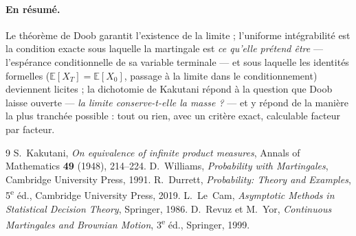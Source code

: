 \documentclass[11pt,a4paper]{article}
\theoremstyle{plain}
\theoremstyle{definition}
\theoremstyle{remark}
\newcommand{\E}{\mathbb{E}}
\begin{document}
\paragraph{En résumé.}
Le théorème de Doob garantit l'existence de la limite ; l'uniforme
intégrabilité est la condition exacte sous laquelle la martingale est \emph{ce
qu'elle prétend être} --- l'espérance conditionnelle de sa variable terminale
--- et sous laquelle les identités formelles ($\E[X_T] = \E[X_0]$, passage à la
limite dans le conditionnement) deviennent licites ; la dichotomie de Kakutani
répond à la question que Doob laisse ouverte --- \emph{la limite
conserve-t-elle la masse ?} --- et y répond de la manière la plus tranchée
possible : tout ou rien, avec un critère exact, calculable facteur par facteur.

\begin{thebibliography}{9}
 S.~Kakutani, \emph{On equivalence of infinite product
measures}, Annals of Mathematics \textbf{49} (1948), 214--224.
 D.~Williams, \emph{Probability with Martingales}, Cambridge
University Press, 1991.
 R.~Durrett, \emph{Probability: Theory and Examples},
5\textsuperscript{e} éd., Cambridge University Press, 2019.
 L.~Le~Cam, \emph{Asymptotic Methods in Statistical Decision
Theory}, Springer, 1986.
 D.~Revuz et M.~Yor, \emph{Continuous Martingales and
Brownian Motion}, 3\textsuperscript{e} éd., Springer, 1999.
\end{thebibliography}
\end{document}
